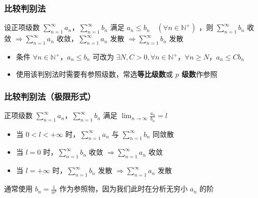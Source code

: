 \documentclass[lang = zh , final , oneside , openany , titlepage , zihao = -4 , linespread = 1.3 , baselineskip = false , cjk-font = windows , text-font = newtx , math-font = newtx]{sjtureport}
\begin{document}
\subsubsection{比较判别法}

\begin{theorem}
    设正项级数
\(\displaystyle \sum_{n=1}^\infty a_n\)，\(\displaystyle \sum_{n=1}^\infty b_n\)
满足 \(a_n \leq b_n \quad (\forall n \in \mathbb{N}^+)\) ，则
\(\displaystyle \sum_{n=1}^\infty b_n\) 收敛
\(\Rightarrow \displaystyle \sum_{n=1}^\infty a_n\)
收敛，\(\displaystyle \sum_{n=1}^\infty a_n\) 发散
\(\Rightarrow \displaystyle \sum_{n=1}^\infty b_n\) 发散
\end{theorem}

\begin{itemize}
\item
  条件 \(\forall n \in \mathbb{N}^+，a_n \leq b_n\) 可改为
  \(\exists N,C >0  ,\forall n\in \mathbb{N}^+，\forall n \geq N，a_n \leq Cb_n\)
\item
  使用该判别法时需要有参照级数，常选\textbf{等比级数}或 \textbf{\(p\)
  级数}作参照
\end{itemize}

\subsubsection{比较判别法（极限形式）}

\begin{theorem}
    正项级数
\(\displaystyle \sum_{n=1}^\infty a_n\)，\(\displaystyle \sum_{n=1}^\infty b_n\)
满足 \(\displaystyle \lim_{n\to\infty} \frac{a_n}{b_n} = l\)

\begin{itemize}
\item
  当 \(0 <l<+\infty\) 时，\(\displaystyle \sum_{n=1}^\infty a_n\) 与
  \(\displaystyle \sum_{n=1}^\infty b_n\) 同敛散
\item
  当 \(l=0\) 时，\(\displaystyle \sum_{n=1}^\infty b_n\) 收敛
  \(\Rightarrow \displaystyle \sum_{n=1}^\infty a_n\) 收敛
\item
  当 \(l=+\infty\) 时，\(\displaystyle \sum_{n=1}^\infty b_n\) 发散
  \(\Rightarrow \displaystyle \sum_{n=1}^\infty a_n\) 发散
\end{itemize}
\end{theorem}

\begin{remark}
    通常使用 \(b_n = \frac{1}{n^p}\) 作为参照物，因为我们此时在分析无穷小
\(a_n\) 的阶
\end{remark}
\end{document}
